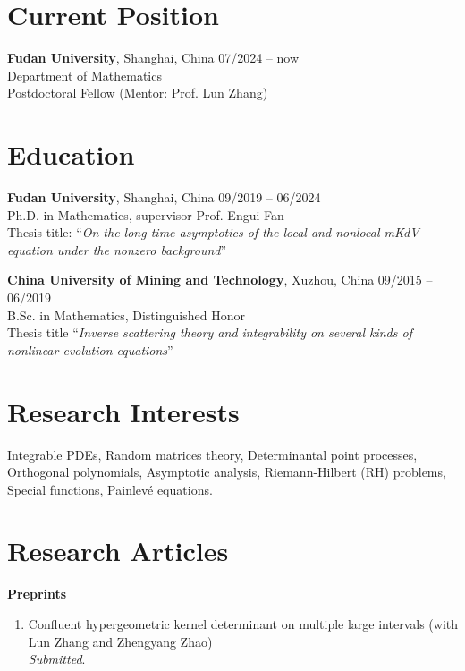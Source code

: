 \documentclass[margin]{res}
\begin{document}
\begin{resume}
\section{Current Position}
\textbf{Fudan University}, Shanghai, China \hfill 07/2024 -- now\\
Department of Mathematics \\
Postdoctoral Fellow (Mentor: Prof. Lun Zhang)


\section{Education}
\textbf{Fudan University}, Shanghai, China \hfill 09/2019 -- 06/2024\\
Ph.D. in Mathematics, supervisor Prof. Engui Fan \\
Thesis title: ``{\sl On the long-time asymptotics of the local and nonlocal mKdV equation under the nonzero background}''
\par

\textbf{China University of Mining and Technology}, Xuzhou, China \hfill 09/2015 -- 06/2019\\ 
B.Sc. in Mathematics, Distinguished Honor \\
Thesis title ``{\sl Inverse scattering theory and integrability on several kinds of nonlinear evolution equations}''


\section{Research Interests}
Integrable PDEs, Random matrices theory, Determinantal point processes, 
Orthogonal polynomials, Asymptotic analysis, Riemann-Hilbert (RH) problems, Special functions, 
Painlev\'e equations.

\section{Research Articles}
\textbf{Preprints}
\begin{enumerate}[1.]
    \item Confluent hypergeometric kernel determinant on multiple large intervals (with Lun Zhang and Zhengyang Zhao)\\
    {\sl Submitted}.
\end{enumerate}


\end{resume}
\end{document}
